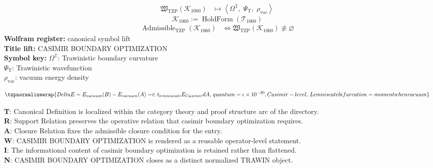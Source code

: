 \noindent
\begin{minipage}[t]{0.48\linewidth}
\begingroup
\small
\[
\begin{aligned}
\mathfrak{W}_{\mathrm{TZP}}\!\left(\mathcal{K}_{1060}\right)
&\longmapsto
\left\langle \Omega^{\mathbb{T}},\; \Psi_{\mathrm{T}},\; \rho_{\mathrm{vac}} \right\rangle
\end{aligned}
\]
\[
\mathcal{K}_{1060}
:=
\operatorname{HoldForm}\!\left(\mathcal{T}_{1060}\right)
\]
\[
\begin{aligned}
\operatorname{Admissible}_{\mathrm{TZP}}\!\left(\mathcal{K}_{1060}\right)
&\Longleftrightarrow
\mathfrak{W}_{\mathrm{TZP}}\!\left(\mathcal{K}_{1060}\right)\not\equiv\varnothing
\end{aligned}
\]
\textbf{Wolfram register:} canonical symbol lift\\
\textbf{Title lift:} CASIMIR BOUNDARY OPTIMIZATION\\
\textbf{Symbol key:} \(\Omega^{\mathbb{T}}\): Trawinistic boundary curvature\\ \(\Psi_{\mathrm{T}}\): Trawinistic wavefunction\\ \(\rho_{\mathrm{vac}}\): vacuum energy density
\par
\endgroup
\end{minipage}\hfill
\begin{minipage}[t]{0.48\linewidth}
\[
\tzpnormalizewrap{Delta E = E_{vacuum}(B) - E_{vacuum}(A) = \in t_{lemniscate} E_{Casimir} dA,\,quantum = \epsilon \times 10^{-30}, Casimir-level,\,Lemniscate bifurcation = moment when vacuum}
\]

\small
\textbf{T}: Canonical Definition is localized within the category theory and proof structure arc of the directory.\\
\textbf{R}: Support Relation preserves the operative relation that casimir boundary optimization requires.\\
\textbf{A}: Closure Relation fixes the admissible closure condition for the entry.\\
\textbf{W}: CASIMIR BOUNDARY OPTIMIZATION is rendered as a reusable operator-level statement.\\
\textbf{I}: The informational content of casimir boundary optimization is retained rather than flattened.\\
\textbf{N}: CASIMIR BOUNDARY OPTIMIZATION closes as a distinct normalized TRAWIN object.
\normalsize
\end{minipage}

